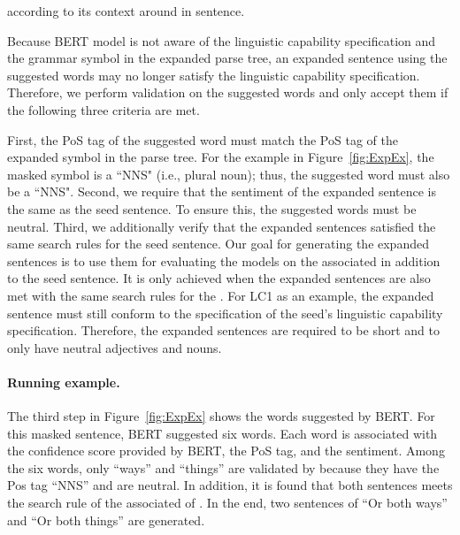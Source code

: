 according to its context  around in
sentence.    

Because BERT model is not aware of the linguistic capability
specification and the grammar symbol in the expanded parse tree, an
expanded sentence using the suggested words may no longer satisfy the
linguistic capability specification. Therefore, we perform validation
on the suggested words and only accept them if the following three
criteria are met.

First, the PoS tag of the suggested word must match the PoS tag of the
expanded symbol in the parse tree. For the example in
Figure~\ref{fig:ExpEx}, the masked symbol is a ``NNS" (i.e., plural
noun); thus, the suggested word must also be a ``NNS".   Second, we require that
the sentiment of the expanded sentence is the same as the seed
sentence. To ensure this, the suggested words must be neutral.
  Third, we additionally verify that the expanded sentences
satisfied the same search rules for the seed sentence. Our goal for
generating the expanded sentences is to use them for evaluating the
\sa models on the associated \lc in addition to the seed sentence. It
is only achieved when the expanded sentences are also met with the
same search rules for the \lc. For LC1 as an example, the expanded
sentence must still conform to the specification of the seed's
linguistic capability specification. Therefore, the expanded sentences
are required to be short and to only have neutral adjectives and
nouns. 

\paragraph{Running example.} The third step in Figure~\ref{fig:ExpEx} shows the words suggested
by BERT. For this masked sentence, BERT suggested six words. Each word
is associated with the confidence score provided by BERT, the PoS tag,
and the sentiment. Among the six words, only ``ways'' and ``things''
are validated by \tool{} because they have the Pos tag ``NNS'' and are
neutral. In addition, it is found that both sentences meets the search
rule of the associated \lc of \SareqExOne. In the end, two sentences
of ``Or both ways'' and ``Or both things'' are generated.  

